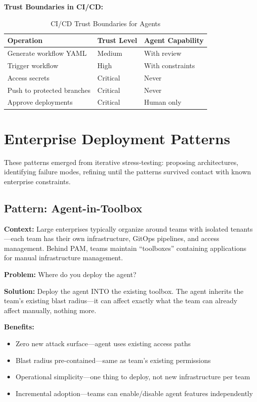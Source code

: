 \textbf{Trust Boundaries in CI/CD:}

\begin{table}[htbp]
\centering
\caption{CI/CD Trust Boundaries for Agents}
\label{tab:cicd-trust}
\begin{tabular}{lll}
\toprule
\textbf{Operation} & \textbf{Trust Level} & \textbf{Agent Capability} \\
\midrule
Generate workflow YAML & Medium & With review \\
Trigger workflow & High & With constraints \\
Access secrets & Critical & Never \\
Push to protected branches & Critical & Never \\
Approve deployments & Critical & Human only \\
\bottomrule
\end{tabular}
\end{table}

\section{Enterprise Deployment Patterns}
\label{sec:enterprise-patterns}

These patterns emerged from iterative stress-testing: proposing architectures, identifying failure modes, refining until the patterns survived contact with known enterprise constraints.

\subsection{Pattern: Agent-in-Toolbox}
\label{subsec:agent-toolbox}

\textbf{Context:} Large enterprises typically organize around teams with isolated tenants---each team has their own infrastructure, GitOps pipelines, and access management. Behind PAM, teams maintain ``toolboxes'' containing applications for manual infrastructure management.

\textbf{Problem:} Where do you deploy the agent?

\textbf{Solution:} Deploy the agent INTO the existing toolbox. The agent inherits the team's existing blast radius---it can affect exactly what the team can already affect manually, nothing more.

\textbf{Benefits:}
\begin{itemize}
    \item Zero new attack surface---agent uses existing access paths
    \item Blast radius pre-contained---same as team's existing permissions
    \item Operational simplicity---one thing to deploy, not new infrastructure per team
    \item Incremental adoption---teams can enable/disable agent features independently
\end{itemize}

